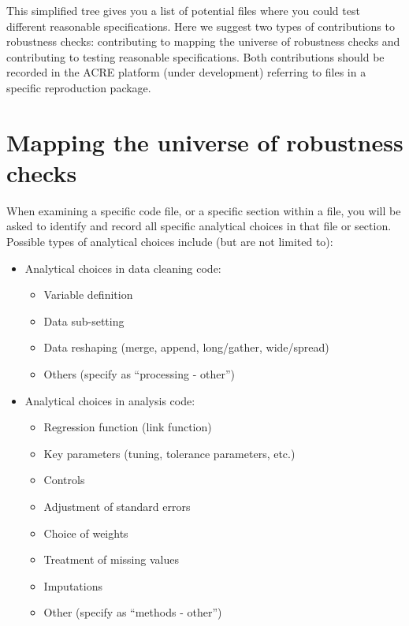 \documentclass[]{book}
\providecommand{\tightlist}{%
  \setlength{\itemsep}{0pt}\setlength{\parskip}{0pt}}
\begin{document}
This simplified tree gives you a list of potential files where you could test different reasonable specifications. Here we suggest two types of contributions to robustness checks: contributing to mapping the universe of robustness checks and contributing to testing reasonable specifications. Both contributions should be recorded in the ACRE platform (under development) referring to files in a specific reproduction package.

\hypertarget{mapping-the-universe-of-robustness-checks}{%
\section{Mapping the universe of robustness checks}\label{mapping-the-universe-of-robustness-checks}}

When examining a specific code file, or a specific section within a file, you will be asked to identify and record all specific analytical choices in that file or section. Possible types of analytical choices include (but are not limited to):

\begin{itemize}
\tightlist
\item
  Analytical choices in data cleaning code:

  \begin{itemize}
  \tightlist
  \item
    Variable definition\\
  \item
    Data sub-setting\\
  \item
    Data reshaping (merge, append, long/gather, wide/spread)\\
  \item
    Others (specify as ``processing - other'')
  \end{itemize}
\item
  Analytical choices in analysis code:

  \begin{itemize}
  \tightlist
  \item
    Regression function (link function)\\
  \item
    Key parameters (tuning, tolerance parameters, etc.)\\
  \item
    Controls\\
  \item
    Adjustment of standard errors\\
  \item
    Choice of weights\\
  \item
    Treatment of missing values\\
  \item
    Imputations
  \item
    Other (specify as ``methods - other'')
  \end{itemize}
\end{itemize}
\end{document}
